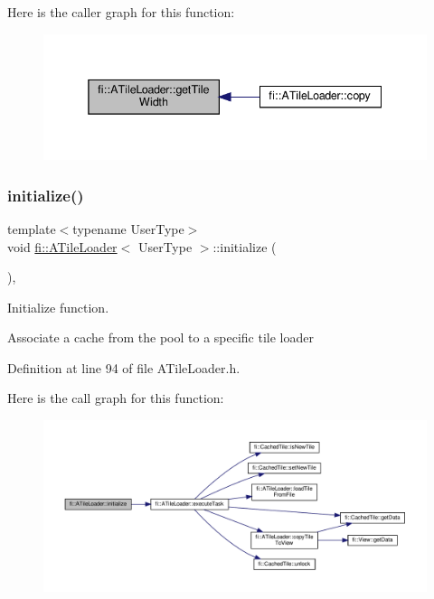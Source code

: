 Here is the caller graph for this function\+:
\nopagebreak
\begin{figure}[H]
\begin{center}
\leavevmode
\includegraphics[width=338pt]{dc/d54/classfi_1_1ATileLoader_ad4ced663628b4134fd8f7bb0cfd2a652_icgraph}
\end{center}
\end{figure}
\mbox{\label{classfi_1_1ATileLoader_a12929a1a82ff9cf2615e7a7420ba92c4}} 
\subsubsection{\texorpdfstring{initialize()}{initialize()}}
{\footnotesize\ttfamily template$<$typename User\+Type$>$ \\
void \hyperlink{classfi_1_1ATileLoader}{fi\+::\+A\+Tile\+Loader}$<$ User\+Type $>$\+::initialize (\begin{DoxyParamCaption}{ }\end{DoxyParamCaption})\hspace{0.3cm}{\ttfamily [inline]}, {\ttfamily [final]}}



Initialize function. 

Associate a cache from the pool to a specific tile loader 

Definition at line 94 of file A\+Tile\+Loader.\+h.

Here is the call graph for this function\+:
\nopagebreak
\begin{figure}[H]
\begin{center}
\leavevmode
\includegraphics[width=350pt]{dc/d54/classfi_1_1ATileLoader_a12929a1a82ff9cf2615e7a7420ba92c4_cgraph}
\end{center}
\end{figure}
\mbox{\label{classfi_1_1ATileLoader_a46d85c52fe89339a3ffbc1cb9c377eb0}} 
